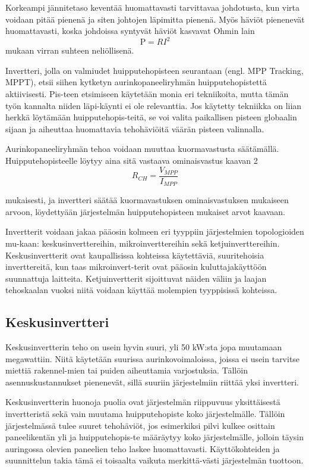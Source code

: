  Korkeampi jännitetaso keventää huomattavasti tarvittavaa johdotusta, kun virta voidaan pitää pienenä ja siten johtojen läpimitta pienenä. Myös häviöt pienenevät huomattavasti, koska johdoissa syntyvät häviöt kasvavat Ohmin lain 
  \begin{equation}
    \textrm{P} = RI^2
  \end{equation}
  mukaan virran suhteen neliöllisenä.

  Invertteri, jolla on valmiudet huipputehopisteen seurantaan (engl. MPP Tracking, MPPT), etsii siihen kytketyn aurinkopaneeliryhmän huipputehopistettä aktiivisesti. Pis-teen etsimiseen käytetään monia eri tekniikoita, mutta tämän työn kannalta niiden läpi-käynti ei ole relevanttia. Jos käytetty tekniikka on liian herkkä löytämään huipputehopis-teitä, se voi valita paikallisen pisteen globaalin sijaan ja aiheuttaa huomattavia tehohäviöitä väärän pisteen valinnalla.

  Aurinkopaneeliryhmän tehoa voidaan muuttaa kuormavastusta säätämällä. Huipputehopisteelle löytyy aina sitä vastaava ominaisvastus kaavan 2
  \begin{equation}
    R_{CH} = \frac{V_{MPP}}{I_{MPP}}
  \end{equation}

  mukaisesti, ja invertteri säätää kuormavastuksen ominaisvastuksen mukaiseen arvoon, löydettyään järjestelmän huipputehopisteen mukaiset arvot kaavaan.

  Invertterit voidaan jakaa pääosin kolmeen eri tyyppiin järjestelmien topologioiden mu-kaan: keskusinverttereihin, mikroinverttereihin sekä ketjuinverttereihin. Keskusinvertterit ovat kaupallisissa kohteissa käytettäviä, suuritehoisia inverttereitä, kun taas mikroinvert-terit ovat pääosin kuluttajakäyttöön suunnattuja laitteita. Ketjuinvertterit sijoittuvat näiden väliin ja laajan tehoskaalan vuoksi niitä voidaan käyttää molempien tyyppisissä kohteissa.

\subsection{Keskusinvertteri}
  Keskusinvertterin teho on usein hyvin suuri, yli 50 kW:sta jopa muutamaan megawattiin. Niitä käytetään suurissa aurinkovoimaloissa, joissa ei usein tarvitse miettiä rakennel-mien tai puiden aiheuttamia varjostuksia. Tällöin asennuskustannukset pienenevät, sillä suuriin järjestelmiin riittää yksi invertteri. 

  Keskusinvertterin huonoja puolia ovat järjestelmän riippuvuus yksittäisestä invertteristä sekä vain muutama huipputehopiste koko järjestelmälle. Tällöin järjestelmässä tulee suuret tehohäviöt, jos esimerkiksi pilvi kulkee osittain paneelikentän yli ja huipputehopis-te määräytyy koko järjestelmälle, jolloin täysin auringossa olevien paneelien teho laskee huomattavasti. Käyttökohteiden ja suunnittelun takia tämä ei toisaalta vaikuta merkittä-västi järjestelmän tuottoon.

